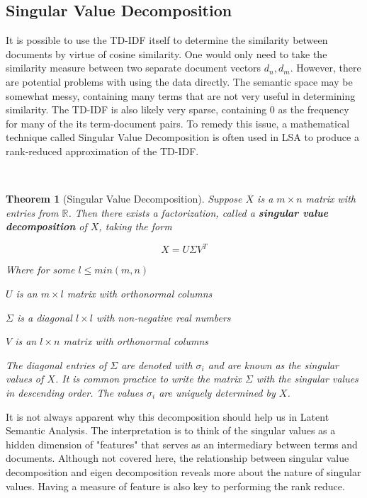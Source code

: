 \documentclass [12pt]{article}
\newtheorem*{theorem}{Theorem}
\newcommand{\tab}{\hspace{10mm}}
\begin{document}
 \subsection{Singular Value Decomposition}
 
It is possible to use the TD-IDF itself to determine the similarity between documents by virtue of cosine similarity. One would only need to take the similarity measure between two separate document vectors $d_n, d_m$. However, there are potential problems with using the data directly. The semantic space may be somewhat messy, containing many terms that are not very useful in determining similarity. The TD-IDF is also likely very sparse, containing 0 as the frequency for many of the its term-document pairs. To remedy this issue, a mathematical technique called Singular Value Decomposition is often used in LSA to produce a rank-reduced approximation of the TD-IDF. 

\

\begin{theorem}[Singular Value Decomposition] 
Suppose $X$ is a $m \times n$ matrix with entries from $\mathbb{R}$. Then there exists a factorization, called a \textbf{singular value decomposition} of $X$, taking the form 

$$ X = U\Sigma V^T$$

Where for some $l \leq min(m, n)$

\tab $U$ is an $m \times l$ matrix with orthonormal columns

\tab $\Sigma$ is a diagonal $l \times l$ with non-negative real numbers

\tab $V$ is an $l \times n$ matrix with orthonormal columns

The diagonal entries of $\Sigma$ are denoted with $\sigma_i$ and are known  as the singular values of $X$. It is common practice to write the matrix $\Sigma$ with the singular values in descending order.  The values $\sigma_i$ are uniquely determined by $X$. 
\end{theorem}

It is not always apparent why this decomposition should help us in Latent Semantic Analysis. The interpretation is to think of the singular values as a hidden dimension of "features" that serves as an intermediary between terms and documents. Although not covered here, the relationship between singular value decomposition and eigen decomposition reveals more about the nature of singular values. Having a measure of feature is also key to performing the rank reduce. 
\end{document}
